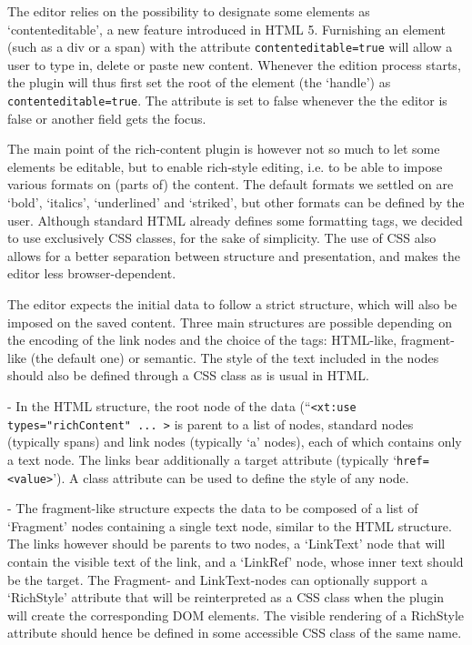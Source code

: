 \documentclass[11pt,a4paper]{article}
\begin{document}
The editor relies on the possibility to designate some elements as `contenteditable', a new feature introduced in HTML 5. Furnishing an element (such as a div or a span) with the attribute \texttt{contenteditable=true} will allow a user to type in, delete or paste new content. Whenever the edition process starts, the plugin will thus first set the root of the element (the `handle') as \texttt{contenteditable=true}. The attribute is set to false whenever the the editor is false or another field gets the focus.

The main point of the rich-content plugin is however not so much to let some elements be editable, but to enable rich-style editing, i.e. to be able to impose various formats on (parts of) the content. The default formats we settled on are `bold', `italics', `underlined' and `striked', but other formats can be defined by the user. Although standard HTML already defines some formatting tags, we decided to use exclusively CSS classes, for the sake of simplicity. The use of CSS also allows for a better separation between structure and presentation, and makes the editor less browser-dependent. 

The editor expects the initial data to follow a strict structure, which will also be imposed on the saved content. Three main structures are possible depending on the encoding of the link nodes and the choice of the tags: HTML-like, fragment-like (the default one) or semantic. The style of the text included in the nodes should also be defined through a CSS class as is usual in HTML. 

- In the HTML structure, the root node of the data (``\verb?<xt:use types="richContent" ... >? is parent to a list of nodes, standard nodes (typically spans) and link nodes (typically `a' nodes), each of which contains only a text node. The links bear additionally a target attribute (typically `\verb?href=<value>?'). A class attribute can be used to define the style of any node.

- The fragment-like structure expects the data to be composed of a list of `Fragment' nodes containing a single text node, similar to the HTML structure. The links however should be parents to two nodes, a `LinkText' node that will contain the visible text of the link, and a `LinkRef' node, whose inner text should be the target. The Fragment- and LinkText-nodes can optionally support a `RichStyle' attribute that will be reinterpreted as a CSS class when the plugin will create the corresponding DOM elements. The visible rendering of a RichStyle attribute should hence be defined in some accessible CSS class of the same name.
\end{document}
